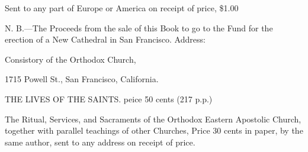 Sent to any part of Europe or America on 
receipt of price, \$1.00 

N. B.—The Proceeds from the sale of this 
Book to go to the Fund for the erection of a 
New Cathedral in San Francisco. 
Address: 

Consistory of the Orthodox Church, 

1715 Powell St., San Francisco, 
California. 



THE LIVES OF THE SAINTS. 
peice 50 cents (217 p.p.) 



The Ritual, Services, and Sacraments of the 
Orthodox Eastern Apostolic Church, together 
with parallel teachings of other Churches, 
Price 30 cents in paper, by the same author, 
sent to any address on receipt of price. 
